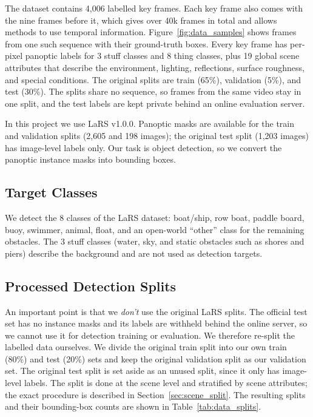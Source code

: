\documentclass[11pt,a4paper]{article}
\begin{document}
The dataset contains 4,006 labelled key frames. Each key frame also comes with
the nine frames before it, which gives over 40k frames in total and allows
methods to use temporal information. Figure~\ref{fig:data_samples} shows frames
from one such sequence with their ground-truth boxes. Every key frame has per-pixel panoptic
labels for 3 stuff classes and 8 thing classes, plus 19 global scene attributes
that describe the environment, lighting, reflections, surface roughness, and
special conditions. The original splits are train (65\%), validation (5\%), and
test (30\%). The splits share no sequence, so frames from the same video stay in
one split, and the test labels are kept private behind an online evaluation
server.

In this project we use LaRS v1.0.0. Panoptic masks are available for the train
and validation splits (2,605 and 198 images); the original test split (1,203
images) has image-level labels only. Our task is object detection, so we convert
the panoptic instance masks into bounding boxes.

\subsection{Target Classes}
We detect the 8 classes of the LaRS dataset: boat/ship, row boat,
paddle board, buoy, swimmer, animal, float, and an open-world ``other'' class
for the remaining obstacles. The 3 stuff classes (water, sky, and static
obstacles such as shores and piers) describe the background and are not used as
detection targets.

\subsection{Processed Detection Splits}
An important point is that we \emph{don't} use the original LaRS splits. The
official test set has no instance masks and its labels are withheld behind the
online server, so we cannot use it for detection training or evaluation. We
therefore re-split the labelled data ourselves. We divide the original train
split into our own train (80\%) and test (20\%) sets and keep the original
validation split as our validation set. The original test split is set aside as
an unused split, since it only has image-level labels. The split is done at the
scene level and stratified by scene attributes; the exact procedure is described
in Section~\ref{sec:scene_split}. The resulting splits and their bounding-box
counts are shown in Table~\ref{tab:data_splits}.
\end{document}
